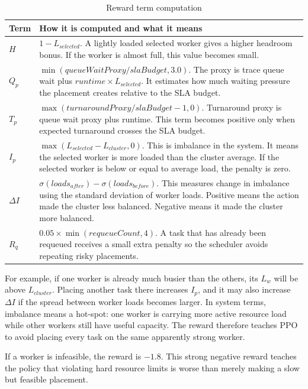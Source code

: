 \begin{table}[H]
\centering
\caption{Reward term computation}
\label{tab:reward_terms}
\begin{tabularx}{\textwidth}{lX}
\toprule
\textbf{Term} & \textbf{How it is computed and what it means} \\
\midrule
\(H\) & \(1 - L_{selected}\). A lightly loaded selected worker gives a higher headroom bonus. If the worker is almost full, this value becomes small. \\
\(Q_p\) & \(\min(queueWaitProxy / slaBudget, 3.0)\). The proxy is trace queue wait plus \(runtime \times L_{selected}\). It estimates how much waiting pressure the placement creates relative to the SLA budget. \\
\(T_p\) & \(\max(turnaroundProxy / slaBudget - 1, 0)\). Turnaround proxy is queue wait proxy plus runtime. This term becomes positive only when expected turnaround crosses the SLA budget. \\
\(I_p\) & \(\max(L_{selected} - L_{cluster}, 0)\). This is imbalance in the system. It means the selected worker is more loaded than the cluster average. If the selected worker is below or equal to average load, the penalty is zero. \\
\(\Delta I\) & \(\sigma(loads_{after}) - \sigma(loads_{before})\). This measures change in imbalance using the standard deviation of worker loads. Positive means the action made the cluster less balanced. Negative means it made the cluster more balanced. \\
\(R_q\) & \(0.05 \times \min(requeueCount, 4)\). A task that has already been requeued receives a small extra penalty so the scheduler avoids repeating risky placements. \\
\bottomrule
\end{tabularx}
\end{table}

For example, if one worker is already much busier than the others, its \(L_w\) will be above \(L_{cluster}\). Placing another task there increases \(I_p\), and it may also increase \(\Delta I\) if the spread between worker loads becomes larger. In system terms, imbalance means a hot-spot: one worker is carrying more active resource load while other workers still have useful capacity. The reward therefore teaches PPO to avoid placing every task on the same apparently strong worker.

If a worker is infeasible, the reward is \(-1.8\). This strong negative reward teaches the policy that violating hard resource limits is worse than merely making a slow but feasible placement.

